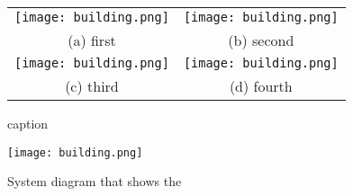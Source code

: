 \begin{appendices}
\begin{figure}[H]
\begin{minipage}{.5\textwidth}
\begin{tabular}{cc}
  \texttt{[image: building.png]} &   \texttt{[image: building.png]} \\
(a) first & (b) second \\[6pt]
 \texttt{[image: building.png]} &   \texttt{[image: building.png]} \\
(c) third & (d) fourth \\[6pt]
\end{tabular}
\caption{caption}
\end{minipage}%
\begin{minipage}{.5\textwidth}
    \centering
    \texttt{[image: building.png]}
    \caption{System diagram that shows the }
    \label{fig:timeline}
\end{minipage}%

\end{figure}


\end{appendices}
